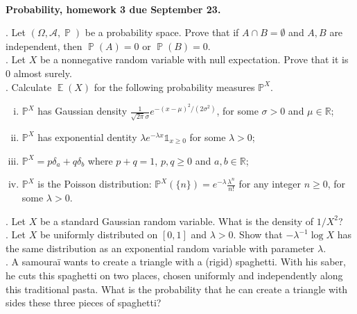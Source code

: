 \documentclass[11pt,reqno]{amsart}
\newcommand{\RR}{{\mathbb R}}
\DeclareMathOperator{\Prob}{\mathbb{P}}   %
\DeclareMathOperator{\E}{\mathbb{E}}      %
\theoremstyle{definition}
\theoremstyle{remark}
\newcommand{\1}{\mathds{1}}
\numberwithin{equation}{section}
\begin{document}
~\vspace{-3cm}
\begin{center}
{\bf Probability, homework 3 due September 23.}
\end{center}
\vspace{1cm}
\small



.
Let $(\Omega,\mathcal{A},\Prob)$ be a probability space. Prove that if $A\cap B=\emptyset$ and $A,B$ are independent, then $\Prob(A)=0$ or $\Prob(B)=0$.\\



. Let $X$ be a nonnegative random variable with null expectation. Prove that it is $0$ almost surely.\\



. Calculate $\E(X)$ for the following probability measures $\mathbb{P}^X$.
\begin{enumerate}[(i)]
\item $\mathbb{P}^X$ has Gaussian density $\frac{1}{\sqrt{2\pi}\sigma}e^{-(x-\mu)^2/(2\sigma^2)}$, for some $\sigma>0$ and $\mu\in\RR$;
\item $\mathbb{P}^X$ has exponential dentity $\lambda e^{-\lambda x}\mathds{1}_{x\geq 0}$ for some $\lambda>0$;
\item $\mathbb{P}^X=p \delta_a+q\delta_b$ where $p+q=1$, $p,q\geq 0$ and $a,b\in\RR$;
\item $\mathbb{P}^X$ is the Poisson distribution: $\mathbb{P}^X(\{n\})=e^{-\lambda}\frac{\lambda^n}{n!}$ for any integer $n\geq 0$, for some $\lambda>0$.\\
\end{enumerate}


.
Let $X$ be a standard Gaussian random variable. What is the density of $1/X^2$?\\



.
Let $X$ be uniformly distributed on $[0,1]$ and $\lambda>0$. Show that $-\lambda^{-1}\log X$ has the same distribution as an exponential random variable with parameter $\lambda$.\\



. A samoura\"i wants to create a triangle with a (rigid) spaghetti. With his saber, he cuts this spaghetti on two places, chosen uniformly and independently along this traditional pasta. What is the probability that he can create a triangle with sides these three pieces of spaghetti?\\
\end{document}
